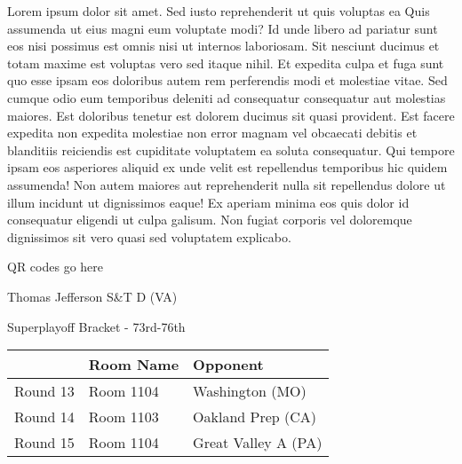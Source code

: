 \documentclass{article}%
\begin{document}
\vspace*{8pt}%
\linebreak%
\newline%
\newline%
Lorem ipsum dolor sit amet. Sed iusto reprehenderit ut quis voluptas ea Quis assumenda ut eius magni eum voluptate modi? Id unde libero ad pariatur sunt eos nisi possimus est omnis nisi ut internos laboriosam. Sit nesciunt ducimus et totam maxime est voluptas vero sed itaque nihil. Et expedita culpa et fuga sunt quo esse ipsam eos doloribus autem rem perferendis modi et molestiae vitae.\newline%
\newline%
Sed cumque odio eum temporibus deleniti ad consequatur consequatur aut molestias maiores. Est doloribus tenetur est dolorem ducimus sit quasi provident. Est facere expedita non expedita molestiae non error magnam vel obcaecati debitis et blanditiis reiciendis est cupiditate voluptatem ea soluta consequatur. Qui tempore ipsam eos asperiores aliquid ex unde velit est repellendus temporibus hic quidem assumenda!\newline%
\newline%
Non autem maiores aut reprehenderit nulla sit repellendus dolore ut illum incidunt ut dignissimos eaque! Ex aperiam minima eos quis dolor id consequatur eligendi ut culpa galisum. Non fugiat corporis vel doloremque dignissimos sit vero quasi sed voluptatem explicabo.\newline%
\newline%
%
\vspace*{30pt}%
\begin{center}%
\begin{Huge}%
QR codes go here%
\end{Huge}%
\end{center}%
\newpage%
\begin{center}%
\begin{Huge}%
Thomas Jefferson S\&T D (VA)%
\end{Huge}%
\vspace*{8pt}%
\linebreak%
\begin{Large}%
Superplayoff Bracket {-} 73rd{-}76th%
\end{Large}%
\end{center}%
%
\begin{tabularx}{\textwidth}{|c|Y|Y|}%
\hline%
&Room Name&Opponent\\%
\hline%
Round 13&Room 1104&Washington (MO)\\%
Round 14&Room 1103&Oakland Prep (CA)\\%
Round 15&Room 1104&Great Valley A (PA)\\%
\hline%
\end{tabularx}%
\end{document}
